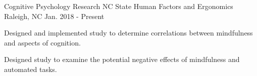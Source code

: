 

\begin{cventries}

  \cventry
    {Cognitive Psychology Research} %
    {NC State Human Factors and Ergonomics} %
    {Raleigh, NC} %
    {Jan. 2018 - Present} %
    {
      \begin{cvitems} %
        \item {Designed and implemented study to determine correlations between mindfulness and aspects of cognition.}
        \item {Designed study to examine the potential negative effects of mindfulness and automated tasks.}
      \end{cvitems}
    }

\end{cventries}
